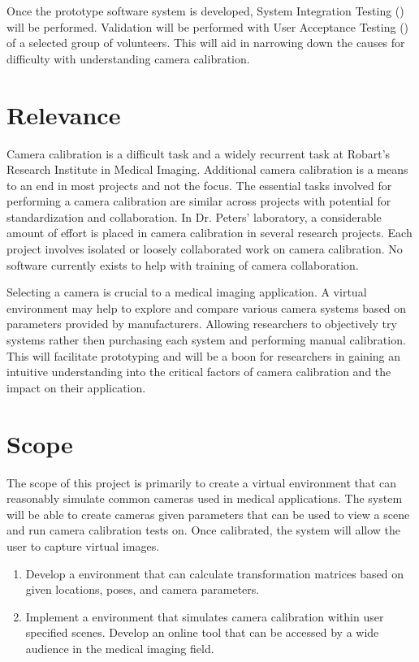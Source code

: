 \documentclass[11pt]{report}
\begin{document}

Once the prototype software system is developed, System Integration Testing () will be performed. Validation will be performed with User Acceptance Testing () of a selected group of volunteers. This will aid in narrowing down the causes for difficulty with understanding camera calibration. 

\section{Relevance}

Camera calibration is a difficult task and a widely recurrent task at Robart's Research Institute in Medical Imaging. Additional camera calibration is a means to an end in most projects and not the focus. The essential tasks involved for performing a camera calibration are similar across projects with potential for standardization and collaboration. In Dr. Peters' laboratory, a considerable amount of effort is placed in camera calibration in several research projects. Each project involves isolated or loosely collaborated work on camera calibration. No software currently exists to help with training of camera collaboration. 

Selecting a camera is crucial to a medical imaging application. A virtual environment may help to explore and compare various camera systems based on parameters provided by manufacturers. Allowing researchers to objectively try systems rather then purchasing each system and performing manual calibration. This will facilitate prototyping and will be a boon for researchers in  gaining an intuitive understanding into the critical factors of camera calibration and the impact on their application. 

\section{Scope}
The scope of this project is primarily to create a virtual environment that can reasonably simulate common cameras used in medical applications. The system will be able to create cameras given parameters that can be used to view a scene and run camera calibration tests on. Once calibrated, the system will allow the user to capture virtual images. 
 
\begin{enumerate}
\item Develop a  environment that can calculate transformation matrices based on given locations, poses, and camera parameters.  
\item Implement a  environment that simulates camera calibration within user specified scenes. Develop an online tool that can be accessed by a wide audience in the medical imaging field.
\end{enumerate}
\end{document}
